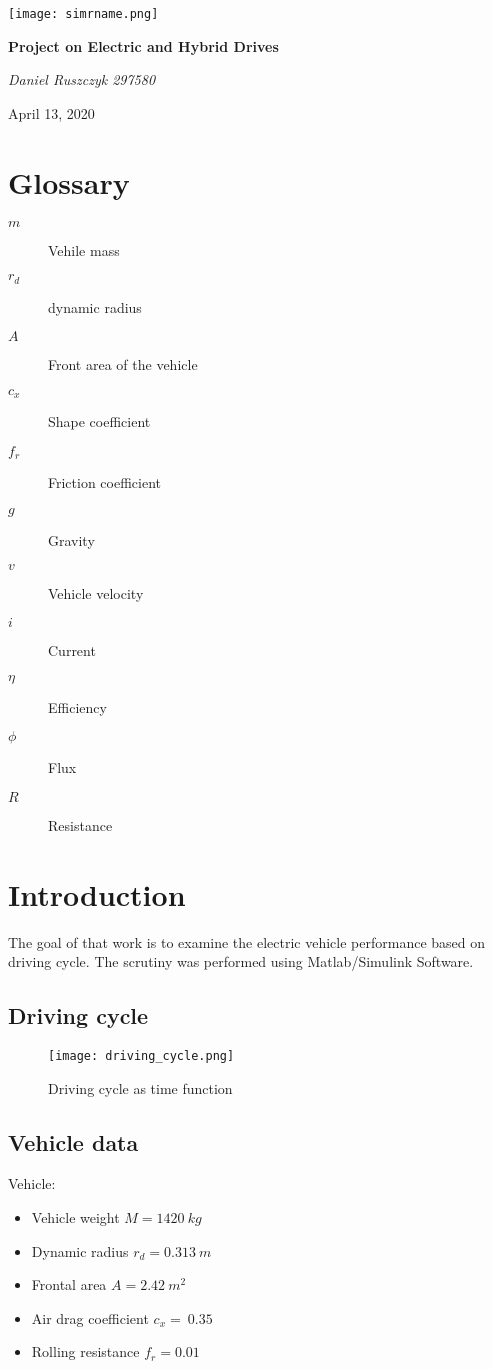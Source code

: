 \documentclass[a4paper,14pt,twoside]{extreport}
\begin{document}
\begin{titlepage}
\centering

\texttt{[image: simrname.png]} 

\vspace{8cm}
{\Large \bfseries Project on Electric and Hybrid Drives}

\vspace{2cm}
{\large \textit{Daniel Ruszczyk 297580}}


\vspace{6cm}
April 13, 2020
\end{titlepage}
\tableofcontents
\setcounter{chapter}{-1}
\chapter{Glossary}
\begin{description}%
\item[$m$]%
Vehile mass%
\item[$r_{d}$]%
dynamic radius%
\item[$A$]%
Front area of the vehicle%
\item[$c_{x}$]%
Shape coefficient%
\item[$f_{r}$]%
Friction coefficient%
\item[$g$]%
Gravity%
\item[$v$]%
Vehicle velocity%
\item[$i$]%
Current%
\item[$\eta$]%
Efficiency%
\item[$\phi$]%
Flux%
\item[$R$]%
Resistance%
\end{description}%
\chapter{Introduction}
The goal of that work is to examine the electric vehicle performance based on driving cycle. The scrutiny was performed using Matlab/Simulink Software.
\section{Driving cycle}
\begin{figure}[H]
  \centerline{\texttt{[image: driving\_cycle.png]}} 
  \caption{Driving cycle as time function}
\end{figure}
\section{Vehicle data}
Vehicle:
\begin{itemize}
    \item Vehicle weight $M = 1420 ~ kg$
    \item Dynamic radius $r_{d} =  0.313 ~ m$
    \item Frontal area $A =2.42  ~ m^2$
    \item Air drag coefficient $c_{x} = ~ 0.35$
    \item Rolling resistance $f_{r} = 0.01$
\end{itemize}
\end{document}
